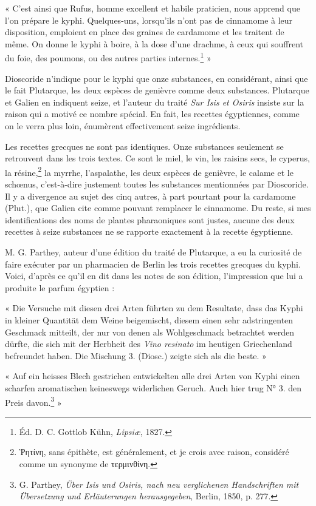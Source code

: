 \documentclass[a4paper, 11pt, oneside, landscape]{article}
\begin{document}
« C'est ainsi que Rufus, homme excellent et habile praticien, nous apprend que l'on prépare le kyphi. Quelques-uns, lorsqu'ils n'ont pas de cinnamome à leur disposition, emploient en place des graines de cardamome et les traitent de même. On donne le kyphi à boire, à la dose d'une drachme, à ceux qui souffrent du foie, des poumons, ou des autres parties internes.\footnote{Éd. D. C. Gottlob Kühn, \emph{Lipsiæ}, 1827.} »

Dioscoride n'indique pour le kyphi que onze substances, en considérant, ainsi que le fait Plutarque, les deux espèces de genièvre comme deux substances. Plutarque et Galien en indiquent seize, et l'auteur du traité \emph{Sur Isis et Osiris} insiste sur la raison qui a motivé ce nombre spécial. En fait, les recettes égyptiennes, comme on le verra plus loin, énumèrent effectivement seize ingrédients.

Les recettes grecques ne sont pas identiques. Onze substances seulement se retrouvent dans les trois textes. Ce sont le miel, le vin, les raisins secs, le cyperus, la résine,\footnote{Ῥητίνη, sans épithète, est généralement, et je crois avec raison, considéré comme un synonyme de τερμινθίνη.} la myrrhe, l'aspalathe, les deux espèces de genièvre, le calame et le schœnus, c'est-à-dire justement toutes les substances mentionnées par Dioscoride. Il y a divergence au sujet des cinq autres, à part pourtant pour la cardamome (Plut.), que Galien cite comme pouvant remplacer le cinnamome. Du reste, si mes identifications des noms de plantes pharaoniques sont justes, aucune des deux recettes à seize substances ne se rapporte exactement à la recette égyptienne.

M. G. Parthey, auteur d'une édition du traité de Plutarque, a eu la curiosité de faire exécuter par un pharmacien de Berlin les trois recettes grecques du kyphi. Voici, d'après ce qu'il en dit dans les notes de son édition, l'impression que lui a produite le parfum égyptien :

« Die Versuche mit diesen drei Arten führten zu dem Resultate, dass das Kyphi in kleiner Quantität dem Weine beigemischt, diesem einen sehr adstringenten Geschmack mitteilt, der nur von denen als Wohlgeschmack betrachtet werden dürfte, die sich mit der Herbheit des \emph{Vino resinato} im heutigen Griechenland befreundet haben. Die Mischung 3. (Diosc.) zeigte sich als die beste. »

« Auf ein heisses Blech gestrichen entwickelten alle drei Arten von Kyphi einen scharfen aromatischen keineswegs widerlichen Geruch. Auch hier trug N° 3. den Preis davon.\footnote{G. Parthey, \emph{Über Isis und Osiris, nach neu verglichenen Handschriften mit Übersetzung und Erläuterungen herausgegeben}, Berlin, 1850, p. 277.} »
\end{document}
